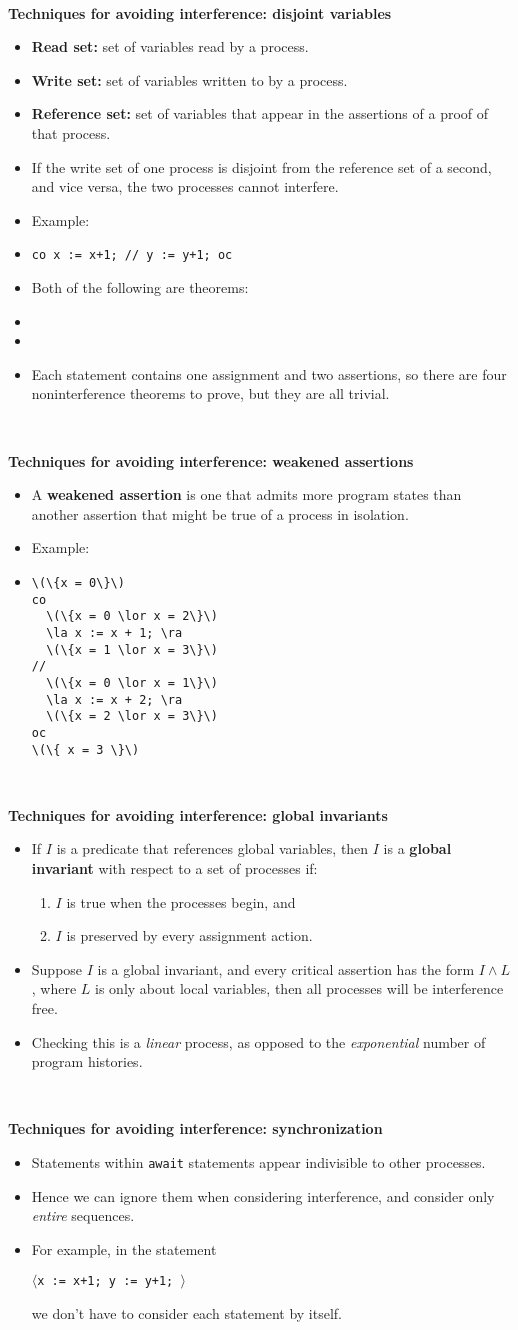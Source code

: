 \documentclass{article}
\newcommand{\bi}{\begin{itemize}}
\newcommand{\ii}{\item}
\newcommand{\ei}{\end{itemize}}
\newcommand{\ti}[1]{
\mbox{~}

\vspace{1.25in}
\centerline{\bf #1}}
\newcommand{\la}{\ensuremath{\langle}}
\newcommand{\ra}{\ensuremath{\rangle}}
\begin{document}
\ti{Techniques for avoiding interference:  disjoint variables}
\bi
\ii {\bf Read set:} set of variables read by a process.
\ii {\bf Write set:} set of variables written to by a process.
\ii {\bf Reference set:} set of variables that appear in the
assertions of a proof of that process.
\ii If the write set of one process is disjoint from the reference set
of a second, and vice versa, the two processes cannot interfere.
\ii Example:
\ii {\tt co x := x+1; // y := y+1; oc}
\ii Both of the following are theorems:
\ii {}
\ii {}
\ii Each statement contains one assignment and two assertions, so
there are four noninterference theorems to prove, but they are all
trivial. 
\ei

\newpage

\ti{Techniques for avoiding interference: weakened assertions}
\bi
\ii A {\bf weakened assertion} is one that admits more program states
than another assertion that might be true of a process in isolation.
\ii Example:
\ii
\begin{Verbatim}
\(\{x = 0\}\)
co 
  \(\{x = 0 \lor x = 2\}\)
  \la x := x + 1; \ra
  \(\{x = 1 \lor x = 3\}\)
//
  \(\{x = 0 \lor x = 1\}\)
  \la x := x + 2; \ra
  \(\{x = 2 \lor x = 3\}\)
oc
\(\{ x = 3 \}\)
\end{Verbatim}
\ei

\newpage
\ti {Techniques for avoiding interference: global invariants}
\bi
\ii If $I$ is a predicate that references global variables, then $I$
is a {\bf global invariant} with respect to a set of processes if:
\begin{enumerate}
\ii $I$ is true when the processes begin, and
\ii $I$ is preserved by every assignment action.
\end{enumerate}
\bigskip
\ii Suppose $I$ is a global invariant, and every critical assertion
has the form $I \land L$, where $L$ is only about local variables,
then all processes will be interference free.
\ii Checking this is a {\em linear} process, as opposed to the {\em
  exponential } number of program histories.
\ei

\newpage
\ti {Techniques for avoiding interference: synchronization}
\bi
\ii Statements within {\tt await} statements appear indivisible to
other processes.
\ii Hence we can ignore them when considering interference, and
consider only {\em entire} sequences.
\ii For example, in the statement\\
\centerline{\tt \la x := x+1; y := y+1; \ra}
we don't have to consider each statement by itself.
\ei
\end{document}

